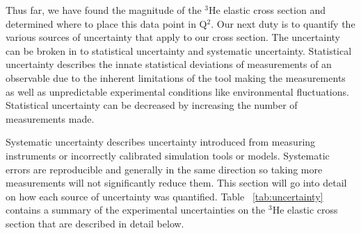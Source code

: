 Thus far, we have found the magnitude of the $^3$He elastic cross section and determined where to place this data point in Q$^2$. Our next duty is to quantify the various sources of uncertainty that apply to our cross section. The uncertainty can be broken in to statistical uncertainty and systematic uncertainty. Statistical uncertainty describes the innate statistical deviations of measurements of an observable due to the inherent limitations of the tool making the measurements as well as unpredictable experimental conditions like environmental fluctuations. Statistical uncertainty can be decreased by increasing the number of measurements made. 

Systematic uncertainty describes uncertainty introduced from measuring instruments or incorrectly calibrated simulation tools or models. Systematic errors are reproducible and generally in the same direction so taking more measurements will not significantly reduce them. This section will go into detail on how each source of uncertainty was quantified. Table ~\ref{tab:uncertainty} contains a summary of the experimental uncertainties on the $^3$He elastic cross section that are described in detail below.

\vspace{5mm}


